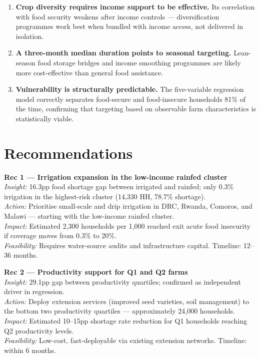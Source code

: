 \documentclass[11pt,a4paper]{article}
\begin{document}
\begin{enumerate}
  \item \textbf{Crop diversity requires income support to be effective.} Its correlation with food security weakens after income controls — diversification programmes work best when bundled with income access, not delivered in isolation.

  \item \textbf{A three-month median duration points to seasonal targeting.} Lean-season food storage bridges and income smoothing programmes are likely more cost-effective than general food assistance.

  \item \textbf{Vulnerability is structurally predictable.} The five-variable regression model correctly separates food-secure and food-insecure households 81\% of the time, confirming that targeting based on observable farm characteristics is statistically viable.

\end{enumerate}

\newpage

\section{Recommendations}

\begin{findingbox}
\textbf{Rec 1 — Irrigation expansion in the low-income rainfed cluster}\\[4pt]
\textit{Insight:} 16.3pp food shortage gap between irrigated and rainfed; only 0.3\% irrigation in the highest-risk cluster (14,330 HH, 78.7\% shortage).\\[3pt]
\textit{Action:} Prioritise small-scale and drip irrigation in DRC, Rwanda, Comoros, and Malawi — starting with the low-income rainfed cluster.\\[3pt]
\textit{Impact:} Estimated 2,300 households per 1,000 reached exit acute food insecurity if coverage moves from 0.3\% to 20\%.\\[3pt]
\textit{Feasibility:} Requires water-source audits and infrastructure capital. Timeline: 12--36 months.
\end{findingbox}

\vspace{7pt}

\begin{findingbox}
\textbf{Rec 2 — Productivity support for Q1 and Q2 farms}\\[4pt]
\textit{Insight:} 29.1pp gap between productivity quartiles; confirmed as independent driver in regression.\\[3pt]
\textit{Action:} Deploy extension services (improved seed varieties, soil management) to the bottom two productivity quartiles — approximately 24,000 households.\\[3pt]
\textit{Impact:} Estimated 10--15pp shortage rate reduction for Q1 households reaching Q2 productivity levels.\\[3pt]
\textit{Feasibility:} Low-cost, fast-deployable via existing extension networks. Timeline: within 6 months.
\end{findingbox}
\end{document}
